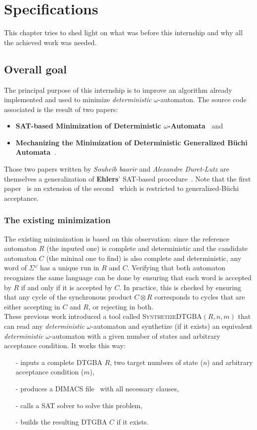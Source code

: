 \chapter{Specifications}
This chapter tries to shed light on what was before this internship and why all the achieved work was
needed.

\section{Overall goal}
The principal purpose of this internship is to improve an algorithm already implemented and used to
minimize \textit{deterministic} $\omega$-automaton. The source code associated is the result of two papers:
\begin{itemize}
 \item \textbf{SAT-based Minimization of Deterministic $\omega$-Automata~\cite{15}} and
 \item \textbf{Mechanizing the Minimization of Deterministic Generalized Büchi Automata~\cite{14}}.
\end{itemize}

Those two papers written by \textit{Souheib baarir} and \textit{Alexandre Duret-Lutz} are themselves a
generalization of \textbf{Ehlers}' SAT-based procedure~\cite{17}. Note that the first paper~\cite{15} is an
extension of the second~\cite{14} which is restricted to generalized-Büchi acceptance.

\subsection{The existing minimization}

The existing minimization is based on this observation: since the reference automaton $R$ (the inputed one)
is complete and deterministic and the candidate automaton $C$ (the mininal one to find) is also complete
and deterministic, any word of $\Sigma^\omega$ has a unique run in $R$ and $C$. Verifying that both
automaton recognizes the same language can be done by ensuring that each word is accepted by $R$ if and only if it is
accepted by $C$. In practice, this is checked by ensuring that any cycle of the synchronous product
$C \otimes R$ corresponds to cycles that are either accepting in $C$ and $R$, or rejecting in both.\\

These previous work introduced a tool called \textsc{Synthetize}DTGBA$(R,n,m)$ that can read any
\textit{deterministic} $\omega$-automaton and synthetize (if it exists) an equivalent \textit{deterministic}
$\omega$-automaton with a given number of states and arbitrary acceptance condition. It works this way:
\begin{itemize}
 \item[-] inputs a complete DTGBA $R$, two target numbers of state ($n$) and arbitrary acceptance condition
          ($m$),
 \item[-] produces a DIMACS file~\cite{18} with all necessary clauses,
 \item[-] calls a SAT solver to solve this problem,
 \item[-] builds the resulting DTGBA $C$ if it exists.
\end{itemize}

